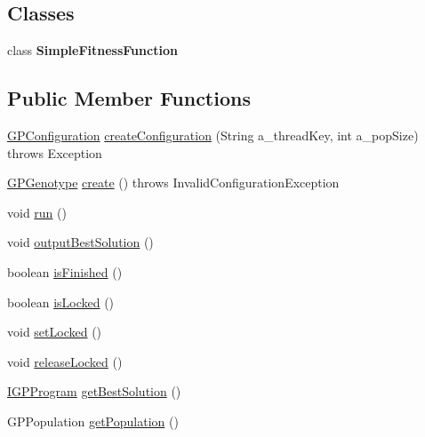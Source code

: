\subsection*{Classes}
\begin{DoxyCompactItemize}
\item 
class {\bfseries Simple\-Fitness\-Function}
\end{DoxyCompactItemize}
\subsection*{Public Member Functions}
\begin{DoxyCompactItemize}
\item 
\hyperlink{classorg_1_1jgap_1_1gp_1_1impl_1_1_g_p_configuration}{G\-P\-Configuration} \hyperlink{classexamples_1_1gp_1_1island_1_1_island_g_p_thread_a808d735b41605cb6c32d9e94978f3fdf}{create\-Configuration} (String a\-\_\-thread\-Key, int a\-\_\-pop\-Size)  throws Exception 
\item 
\hyperlink{classorg_1_1jgap_1_1gp_1_1impl_1_1_g_p_genotype}{G\-P\-Genotype} \hyperlink{classexamples_1_1gp_1_1island_1_1_island_g_p_thread_aeced308135a88ead4bdacd3b4d6abd5d}{create} ()  throws Invalid\-Configuration\-Exception 
\item 
void \hyperlink{classexamples_1_1gp_1_1island_1_1_island_g_p_thread_a07dfbcdb3d4ce55f2a63607c05f46f08}{run} ()
\item 
void \hyperlink{classexamples_1_1gp_1_1island_1_1_island_g_p_thread_ab3d8b8f8aeeaca3c1a1e0461f07863dd}{output\-Best\-Solution} ()
\item 
boolean \hyperlink{classexamples_1_1gp_1_1island_1_1_island_g_p_thread_a00198442cd927bb0c98b5083a20422b7}{is\-Finished} ()
\item 
boolean \hyperlink{classexamples_1_1gp_1_1island_1_1_island_g_p_thread_a442a9747b7e91119157a365395c575ed}{is\-Locked} ()
\item 
void \hyperlink{classexamples_1_1gp_1_1island_1_1_island_g_p_thread_a005f35c903a15a41ef611e5a53387c54}{set\-Locked} ()
\item 
void \hyperlink{classexamples_1_1gp_1_1island_1_1_island_g_p_thread_a9af143e6dd002d19e366c37d478e61a2}{release\-Locked} ()
\item 
\hyperlink{interfaceorg_1_1jgap_1_1gp_1_1_i_g_p_program}{I\-G\-P\-Program} \hyperlink{classexamples_1_1gp_1_1island_1_1_island_g_p_thread_ad3792a80cfc9bbf0949287611de4a60a}{get\-Best\-Solution} ()
\item 
G\-P\-Population \hyperlink{classexamples_1_1gp_1_1island_1_1_island_g_p_thread_a225f9d76b8678685046ec5f41180c8f2}{get\-Population} ()
\end{DoxyCompactItemize}
